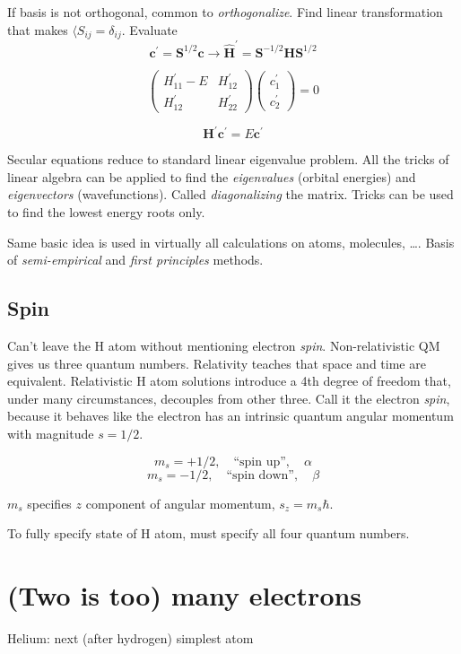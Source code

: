 \documentclass[11pt]{article}
\begin{document}
If basis is not orthogonal, common to \emph{orthogonalize}.  Find linear transformation that makes \(\langle S_{ij} = \delta_{ij}\).  Evaluate
\[ \bm{c}^\prime = \bm{S}^{1/2} \bm{c} \rightarrow \hat{\bm{H}}^\prime = \bm{S}^{-1/2}\bm{H}\bm{S}^{1/2}\]

\[
\left(\begin{array}{cc}
H^\prime_{11} - E & H^\prime_{12}\\
H^\prime_{12} & H^\prime_{22} 
\end{array}\right)\left(
\begin{array}{c} c^\prime_1 \\c^\prime_2\end{array}\right) =0
\]

\[\bm{H}^\prime\bm{c}^\prime = E \bm{c}^\prime \]

Secular equations reduce to standard linear eigenvalue problem.  All the tricks of linear
algebra can be applied to find the \emph{eigenvalues} (orbital energies) and \emph{eigenvectors}
(wavefunctions).  Called \emph{diagonalizing} the matrix.  Tricks can be used to find the
lowest energy roots only.

Same basic idea is used in virtually all calculations on atoms, molecules, \ldots.  Basis
of \emph{semi-empirical} and \emph{first principles} methods.

\subsection{Spin}
\label{sec:org6e285ce}
Can't leave the H atom without mentioning electron \emph{spin}.  Non-relativistic QM gives us three quantum numbers. Relativity teaches that space and time are equivalent. Relativistic H atom solutions introduce a 4th degree of freedom that, under many circumstances, decouples from other three.  Call it the electron \emph{spin}, because it behaves like the electron has an intrinsic quantum angular momentum with magnitude \(s = 1/2\).

\[m_s = +1/2, \quad\text{``spin up''},\quad\alpha\]
\[m_s = -1/2, \quad\text{``spin down''},\quad\beta\]

\(m_s\) specifies \(z\) component of angular momentum, \(s_z = m_s\hbar\).

To fully specify state of H atom, must specify all four quantum numbers.
\newpage

\section{(Two is too) many electrons}
\label{sec:org3249203}
Helium: next (after hydrogen) simplest atom
\end{document}
